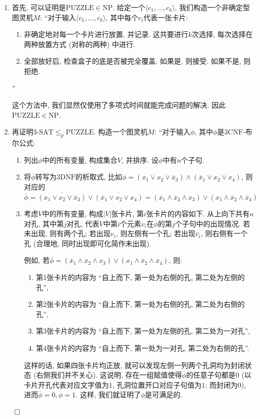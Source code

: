 \documentclass[UTF8]{report}
\renewenvironment{proof}{{\setlength{\parskip}{7pt}\noindent\hskip 2em \bf 证明 \quad}}{\hfill$\qed$\par}
\newcommand{\lno}[1]{\overline{#1}}
\newcommand{\NP}{\mathrm{NP}}
\newcommand{\threeSAT}{\mathrm{3\text{-}SAT}}
\newcommand{\CNF}{\mathrm{CNF}}
\newcommand{\DNF}{\mathrm{DNF}}
\newcommand{\PUZZLE}{\mathrm{PUZZLE}}
\begin{document}
\begin{proof}
    \begin{enumerate}
        \item 
        首先, 可以证明是$\PUZZLE \in \NP$. 给定一个$\langle c_1, \dots ,c_k \rangle$, 我们构造一个非确定型图灵机$M$:
        ``对于输入$\langle c_1, \dots ,c_k \rangle$, 其中每个$c_i$代表一张卡片:
        \begin{enumerate}
            \item 非确定地对每一个卡片进行放置, 并记录. 这共要进行$k$次选择, 每次选择在两种放置方式 (对称的两种) 中进行. 
            \item 全部放好后, 检查盒子的底是否被完全覆盖. 如果是, 则接受. 如果不是, 则拒绝.
        \end{enumerate}
        ''

        这个方法中, 我们显然仅使用了多项式时间就能完成问题的解决. 因此$\PUZZLE \in \NP$.

        \item 
        再证明$\threeSAT \leq_p \PUZZLE$. 构造一个图灵机$M$: ``对于输入$\phi$, 其中$\phi$是$3\CNF$-布尔公式:
        \begin{enumerate}
            \item 列出$\phi$中的所有变量, 构成集合$V$, 并排序. 设$\phi$中有$n$个子句.
            \item 将$\lno\phi$转写为$3\DNF$的析取式, 比如$\phi = (x_1 \lor x_2 \lor \lno x_3) \land (\lno x_1 \lor x_2 \lor x_4)$, 则对应的$\lno \phi = \lno{(x_1 \lor x_2 \lor \lno x_3)} \lor \lno{(\lno x_1 \lor x_2 \lor x_4)} = (\lno x_1 \land \lno x_2 \land x_3) \lor (x_1 \land \lno x_2 \land \lno x_4)$
            \item 考虑$V$中的所有变量, 构成$|V|$张卡片, 第$i$张卡片的内容如下. 从上向下共有$n$对孔, 其中第$j$对孔, 代表$V$中第$i$个元素$v_i$在$\lno\phi$的第$j$个子句中的出现情况. 若未出现, 则有两个孔; 若出现$v_i$, 则左侧有一个孔; 若出现$\lno v_i$, 则右侧有一个孔 (合理地, 同时出现即可化简作未出现).
            
            例如, 若$\lno\phi = (\lno x_1 \land \lno x_2 \land x_3) \lor (x_1 \land \lno x_2 \land \lno x_4)$, 则:
            \begin{enumerate}
                \item 第1张卡片的内容为 ``自上而下, 第一处为右侧的孔, 第二处为左侧的孔'',
                \item 第2张卡片的内容为 ``自上而下, 第一处为右侧的孔, 第二处为右侧的孔'',
                \item 第3张卡片的内容为 ``自上而下, 第一处为左侧的孔, 第二处为一对孔'',
                \item 第4张卡片的内容为 ``自上而下, 第一处为一对孔, 第二处为右侧的孔''.
            \end{enumerate}
            这样的话, 如果四张卡片均正放, 就可以发现左侧一列两个孔洞均为封闭状态 (右侧我们并不关心). 这说明, 存在一组赋值使得$\lno\phi$的任意子句都是$0$ (以卡片开孔代表对应文字值为$1$, 孔洞位置开口对应子句值为$1$; 而封闭为$0$), 进而$\lno\phi = 0, \phi = 1$. 这样, 我们就证明了$\phi$是可满足的.


\end{enumerate}
\end{enumerate}
\end{proof}
\end{document}
